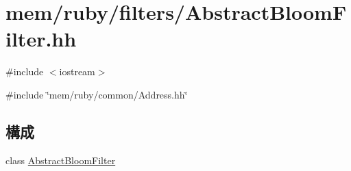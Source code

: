 \hypertarget{AbstractBloomFilter_8hh}{
\section{mem/ruby/filters/AbstractBloomFilter.hh}
\label{AbstractBloomFilter_8hh}
}
{\ttfamily \#include $<$iostream$>$}\par
{\ttfamily \#include \char`\"{}mem/ruby/common/Address.hh\char`\"{}}\par
\subsection*{構成}
\begin{DoxyCompactItemize}
\item 
class \hyperlink{classAbstractBloomFilter}{AbstractBloomFilter}
\end{DoxyCompactItemize}
